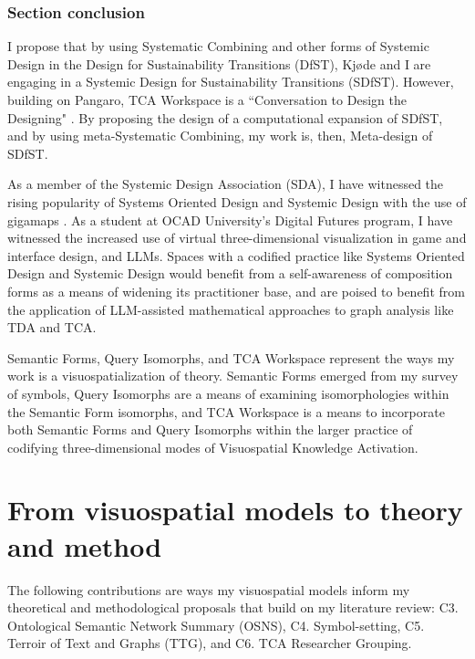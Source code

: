 \subsubsection{Section conclusion}

I propose that by using Systematic Combining and other forms of Systemic Design in the Design for Sustainability Transitions (DfST), Kjøde and I are engaging in a Systemic Design for Sustainability Transitions (SDfST). However, building on Pangaro, TCA Workspace is a  ``Conversation to Design the Designing" \citep[p. 185]{pangaro_design_2011}. By proposing the design of a computational expansion of SDfST, and by using meta-Systematic Combining, my work is, then, Meta-design of SDfST.
  
  

As a member of the Systemic Design Association (SDA), I have witnessed the rising popularity of Systems Oriented Design and Systemic Design with the use of gigamaps \citep{sevaldson_giga-mapping_2011,sevaldson_designing_2022}. As a student at OCAD University’s Digital Futures program, I have witnessed the increased use of virtual three-dimensional visualization in game and interface design, and LLMs. Spaces with a codified practice like Systems Oriented Design and Systemic Design would benefit from a self-awareness of composition forms as a means of widening its practitioner base, and are poised to benefit from the application of LLM-assisted mathematical approaches to graph analysis like TDA and TCA.


Semantic Forms, Query Isomorphs, and TCA Workspace represent the ways my work is a visuospatialization of theory. Semantic Forms emerged from my survey of symbols, Query Isomorphs are a means of examining isomorphologies within the Semantic Form isomorphs, and TCA Workspace is a means to incorporate both Semantic Forms and Query Isomorphs within the larger practice of codifying three-dimensional modes of Visuospatial Knowledge Activation.
    






\section{From visuospatial models to theory and method}
The following contributions are ways my visuospatial models inform my theoretical and methodological proposals that build on my literature review: C3. Ontological Semantic Network Summary (OSNS), C4. Symbol-setting, C5. Terroir of Text and Graphs (TTG), and C6. TCA Researcher Grouping. 

